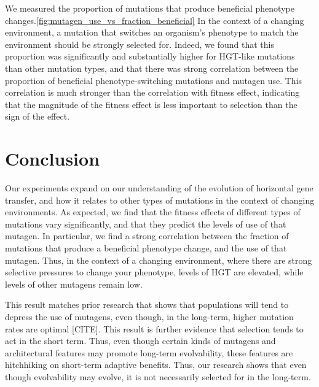 \documentclass[PhD]{msu-thesis}
\begin{document}
We measured the proportion of mutations that produce beneficial phenotype changes.\ref{fig:mutagen_use_vs_fraction_beneficial} In the context of a changing environment, a mutation that switches an organism's phenotype to match the environment should be strongly selected for. Indeed, we found that this proportion was significantly and substantially higher for HGT-like mutations than other mutation types, and that there was strong correlation between the proportion of beneficial phenotype-switching mutations and mutagen use. This correlation is much stronger than the correlation with fitness effect, indicating that the magnitude of the fitness effect is less important to selection than the sign of the effect.





\section{Conclusion}
Our experiments expand on our understanding of the evolution of horizontal gene transfer, and how it relates to other types of mutations in the context of changing environments. As expected, we find that the fitness effects of different types of mutations vary significantly, and that they predict the levels of use of that mutagen. In particular, we find a strong correlation between the fraction of mutations that produce a beneficial phenotype change, and the use of that mutagen. Thus, in the context of a changing environment, where there are strong selective pressures to change your phenotype, levels of HGT are elevated, while levels of other mutagens remain low.

This result matches prior research that shows that populations will tend to depress the use of mutagens, even though, in the long-term, higher mutation rates are optimal [CITE]. This result is further evidence that selection tends to act in the short term. Thus, even though certain kinds of mutagens and architectural features may promote long-term evolvability, these features are hitchhiking on short-term adaptive benefits. Thus, our research shows that even though evolvability may evolve, it is not necessarily selected for in the long-term. 
\end{document}
